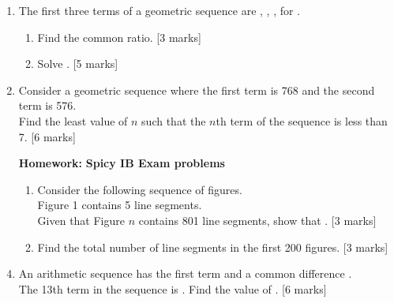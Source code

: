 \documentclass[12pt]{article}
\begin{document}
\begin{enumerate}
\item The first three terms of a geometric sequence are \underline{\hspace{1cm}}, \underline{\hspace{1cm}}, \underline{\hspace{1cm}}, for \underline{\hspace{1cm}}.
    \begin{enumerate}
        \item Find the common ratio. \hfill [3 marks]
        \item Solve \underline{\hspace{2cm}}. \hfill [5 marks]
    \end{enumerate}

\item Consider a geometric sequence where the first term is 768 and the second term is 576.\\
Find the least value of $n$ such that the $n$th term of the sequence is less than 7. \hfill [6 marks]

\item[\textbf{Homework:}] \textbf{Spicy IB Exam problems}
    \begin{enumerate}
        \item Consider the following sequence of figures.\\
        Figure 1 contains 5 line segments.\\
        Given that Figure $n$ contains 801 line segments, show that \underline{\hspace{1cm}}. \hfill [3 marks]
        \item Find the total number of line segments in the first 200 figures. \hfill [3 marks]
    \end{enumerate}

\item An arithmetic sequence has the first term \underline{\hspace{1cm}} and a common difference \underline{\hspace{1cm}}.\\
The 13th term in the sequence is \underline{\hspace{1cm}}. Find the value of \underline{\hspace{1cm}}. \hfill [6 marks]


\end{enumerate}
\end{document}
